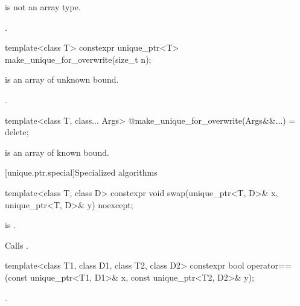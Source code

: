 \begin{itemdescr}
\pnum
\constraints
{} is not an array type.

\pnum
\returns
{}.
\end{itemdescr}

%
\begin{itemdecl}
template<class T> constexpr unique_ptr<T> make_unique_for_overwrite(size_t n);
\end{itemdecl}

\begin{itemdescr}
\pnum
\constraints
{} is an array of unknown bound.

\pnum
\returns
{}.
\end{itemdescr}

%
\begin{itemdecl}
template<class T, class... Args> @\unspec@ make_unique_for_overwrite(Args&&...) = delete;
\end{itemdecl}

\begin{itemdescr}
\pnum
\constraints
{} is an array of known bound.
\end{itemdescr}

[unique.ptr.special]{Specialized algorithms}

%
\begin{itemdecl}
template<class T, class D> constexpr void swap(unique_ptr<T, D>& x, unique_ptr<T, D>& y) noexcept;
\end{itemdecl}

\begin{itemdescr}
\pnum
\constraints
{} is .

\pnum
\effects
Calls .
\end{itemdescr}

%
\begin{itemdecl}
template<class T1, class D1, class T2, class D2>
  constexpr bool operator==(const unique_ptr<T1, D1>& x, const unique_ptr<T2, D2>& y);
\end{itemdecl}

\begin{itemdescr}
\pnum
\returns
{}.
\end{itemdescr}

